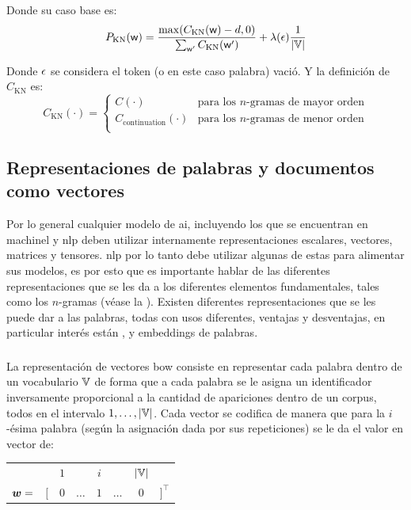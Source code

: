 Donde su caso base es:
\begin{equation}
  P_{\mathrm{KN}}({\mathit{\mathsf{w}}}) = \frac{ \max(C_{\mathrm{KN}}({\mathit{\mathsf{w}}}) -d, 0) }{\sum_{{\mathit{\mathsf{w}}}^{\prime}} C_{\mathrm{KN}}({\mathit{\mathsf{w}}}^{\prime})} + \lambda({\epsilon}) \frac{1}{|{\mathbb{V}}|}
\end{equation}

Donde ${\epsilon}$ se considera el token (o en este caso palabra) vació. Y la definición de $C_{\mathrm{KN}}$ es:
\begin{equation}
  C_{\mathrm{KN}}(\cdot) = \left\{ \begin{array}{ll}
            C(\cdot) & \text{para los $n$-gramas de mayor orden} \\
            C_{\mathrm{continuation}}(\cdot) & \text{para los $n$-gramas de menor orden} \\
          \end{array} \right.
\end{equation}


\subsection{Representaciones de palabras y documentos como vectores} \label{ch:word-representations}
Por lo general cualquier modelo de \gls{ai}, incluyendo los que se encuentran en \gls{machinel} y \gls{nlp} deben utilizar internamente representaciones escalares, vectores, matrices y tensores. \gls{nlp} por lo tanto debe utilizar algunas de estas para alimentar sus modelos, es por esto que es importante hablar de las diferentes representaciones que se les da a los diferentes elementos fundamentales, tales como los $n$-gramas (véase la ). Existen diferentes representaciones que se les puede dar a las palabras, todas con usos diferentes, ventajas y desventajas, en particular interés están ,  y embeddings de palabras.

\subsubsection{}
La representación de vectores \gls{bow} consiste en representar cada palabra dentro de un vocabulario ${\mathbb{V}}$ de forma que a cada palabra se le asigna un identificador inversamente proporcional a la cantidad de apariciones dentro de un \gls{corpus}, todos en el intervalo $1, \ldots, |{\mathbb{V}}|$. Cada vector se codifica de manera que para la $i$-ésima palabra (según la asignación dada por sus repeticiones) se le da el valor en vector de:
\begin{center}
\begin{tabular}{cccccccc}
           &     & $1$ &           & $i$   &          & $|{\mathbb{V}}|$ &  \\
  ${\bm{w}} = $ & $[$ & $0$ & $\ldots$  & $1$ & $\ldots$    & $0$ & $]^{\top}$
\end{tabular}
\end{center}

